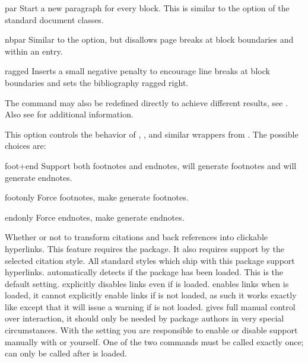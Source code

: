 \documentclass{ltxdockit}[2011/03/25]
\begin{document}
\begin{optionlist}
\begin{valuelist}
\item[par] Start a new paragraph for every block. This is similar to the  option of the standard \latex document classes.

\item[nbpar] Similar to the  option, but disallows page breaks at block boundaries and within an entry.

\item[ragged] Inserts a small negative penalty to encourage line breaks at block boundaries and sets the bibliography ragged right.

\end{valuelist}

The  command may also be redefined directly to achieve different results, see . Also see  for additional information.


This option controls the behavior of , , and similar wrappers from . The possible choices are:

\begin{valuelist}
\item[foot+end] Support both footnotes and endnotes, \ie {} will generate footnotes and  will generate endnotes.
\item[footonly] Force footnotes, \ie make  generate footnotes.
\item[endonly] Force endnotes, \ie make  generate endnotes.
\end{valuelist}


Whether or not to transform citations and back references into clickable hyperlinks. This feature requires the  package. It also requires support by the selected citation style. All standard styles which ship with this package support hyperlinks.  automatically detects if the  package has been loaded. This is the default setting.  explicitly disables links even if  is loaded.  enables links when  is loaded, it cannot explicitly enable links if  is not loaded, as such it works exactly like  except that it will issue a warning if  is not loaded.  gives full manual control over  interaction, it should only be needed by package authors in very special circumstances. With the  setting you are responsible to enable or disable  support manually with  or  yourself. One of the two commands must be called exactly once;  can only be called after  is loaded.


\end{optionlist}
\end{document}

